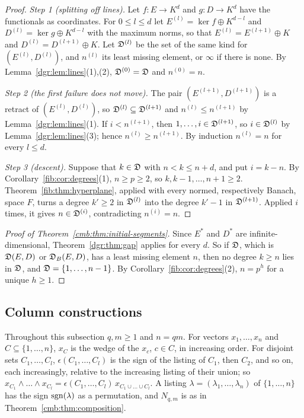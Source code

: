 \begin{proof}
\emph{Step 1 (splitting off lines).} Let $f\colon E\to K^d$ and $g\colon D\to K^d$ have the functionals as coordinates.
For $0\le l\le d$ let $E^{(l)}=\ker f\oplus K^{d-l}$ and $D^{(l)}=\ker g\oplus K^{d-l}$ with the maximum norms, so that
$E^{(l)}=E^{(l+1)}\oplus K$ and $D^{(l)}=D^{(l+1)}\oplus K$. Let $\mathfrak D^{(l)}$ be the set of the same kind for
$(E^{(l)},D^{(l)})$, and $n^{(l)}$ its least missing element, or $\infty$ if there is none. By
Lemma~\ref{dgr:lem:lines}(1),(2), $\mathfrak D^{(0)}=\mathfrak D$ and $n^{(0)}=n$.

\emph{Step 2 (the first failure does not move).} The pair $(E^{(l+1)},D^{(l+1)})$ is a retract of $(E^{(l)},D^{(l)})$,
so $\mathfrak D^{(l)}\subseteq\mathfrak D^{(l+1)}$ and $n^{(l)}\le n^{(l+1)}$ by Lemma~\ref{dgr:lem:lines}(1). If $i<n^{(l+1)}$, then
$1,\dots,i\in\mathfrak D^{(l+1)}$, so $i\in\mathfrak D^{(l)}$ by Lemma~\ref{dgr:lem:lines}(3); hence $n^{(l)}\ge n^{(l+1)}$. By induction
$n^{(l)}=n$ for every $l\le d$.

\emph{Step 3 (descent).} Suppose that $k\in\mathfrak D$ with $n<k\le n+d$, and put $i=k-n$. By
Corollary~\ref{fib:cor:degrees}(1), $n\ge p\ge2$, so $k,k-1,\dots,n+1\ge2$. Theorem~\ref{fib:thm:hyperplane}, applied with
every normed, respectively Banach, space $F$, turns a degree $k'\ge2$ in $\mathfrak D^{(l)}$ into the degree $k'-1$ in
$\mathfrak D^{(l+1)}$. Applied $i$ times, it gives $n\in\mathfrak D^{(i)}$, contradicting $n^{(i)}=n$.
\end{proof}

\begin{proof}[Proof of Theorem~\ref{cmb:thm:initial-segments}]
Since $E^*$ and $D^*$ are infinite-dimensional, Theorem~\ref{dgr:thm:gap} applies for every $d$. So if $\mathfrak D$, which is
$\mathfrak D(E,D)$ or $\mathfrak D_B(E,D)$, has a least missing element $n$, then no degree $k\ge n$ lies in $\mathfrak D$, and
$\mathfrak D=\{1,\dots,n-1\}$. By Corollary~\ref{fib:cor:degrees}(2), $n=p^h$ for a unique $h\ge1$.
\end{proof}

\subsection{Column constructions}\label{dgr:ssec:columns}

Throughout this subsection $q,m\ge1$ and $n=qm$. For vectors $x_1,\dots,x_n$ and $C\subseteq\{1,\dots,n\}$, $x_C$ is the
wedge of the $x_c$, $c\in C$, in increasing order. For disjoint sets $C_1,\dots,C_l$, $\epsilon(C_1,\dots,C_l)$ is the sign
of the listing of $C_1$, then $C_2$, and so on, each increasingly, relative to the increasing listing of their union; so
$x_{C_1}\wedge\dots\wedge x_{C_l}=\epsilon(C_1,\dots,C_l)\,x_{C_1\cup\dots\cup C_l}$. A listing
$\lambda=(\lambda_1,\dots,\lambda_n)$ of $\{1,\dots,n\}$ has the sign $\operatorname{sgn}(\lambda)$ as a permutation, and $N_{q,m}$ is as
in Theorem~\ref{cmb:thm:composition}.

